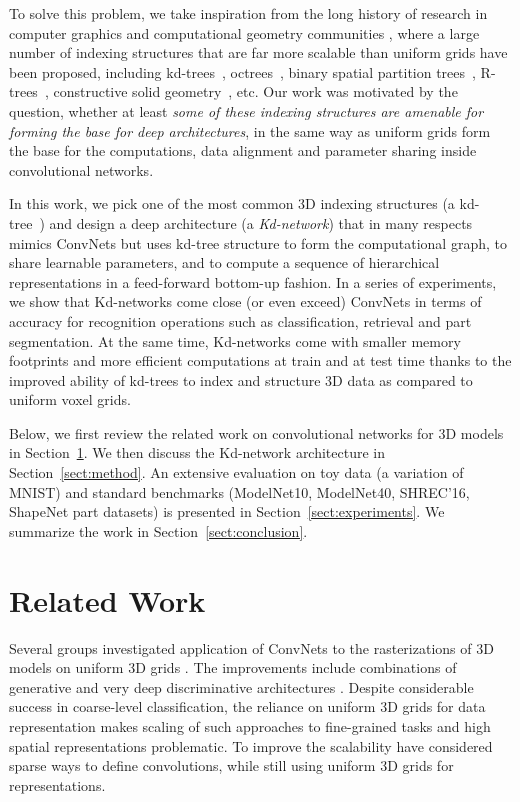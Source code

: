 \documentclass[10pt,twocolumn,letterpaper]{article}
\newcommand{\sect}[1]{Section~\ref{sect:#1}}
\begin{document}
To solve this problem, we take inspiration from the long history of research in computer graphics and computational geometry communities \cite{Samet90,Foley94}, where a large number of indexing structures that are far more scalable than uniform grids have been proposed, including kd-trees~\cite{Bentley75}, octrees~\cite{Meagher80}, binary spatial partition trees~\cite{Schumacker69}, R-trees~\cite{Guttman84}, constructive solid geometry~\cite{Requicha77}, etc. Our work was motivated by the question, whether at least \textit{some of these indexing structures are amenable for forming the base for deep architectures}, in the same way as uniform grids form the base for the computations, data alignment and parameter sharing inside convolutional networks.

In this work, we pick one of the most common 3D indexing structures (a kd-tree~\cite{Bentley75}) and design a deep architecture (a \textit{Kd-network}) that in many respects mimics ConvNets but uses kd-tree structure to form the computational graph, to share learnable parameters, and to compute a sequence of hierarchical representations in a feed-forward bottom-up fashion. In a series of experiments, we show that Kd-networks come close (or even exceed) ConvNets in terms of accuracy for recognition operations such as classification, retrieval and part segmentation. At the same time, Kd-networks come with smaller memory footprints and more efficient computations at train and at test time thanks to the improved ability of kd-trees to index and structure 3D data as compared to uniform voxel grids.

Below, we first review the related work on convolutional networks for 3D models in \sect{related}. We then discuss the Kd-network architecture in \sect{method}. An extensive evaluation on toy data (a variation of MNIST) and standard benchmarks (ModelNet10, ModelNet40, SHREC'16, ShapeNet part datasets) is presented in \sect{experiments}. We summarize the work in \sect{conclusion}.
 \section{Related Work}
\label{sect:related}

Several groups investigated application of ConvNets to the rasterizations of 3D models on uniform 3D grids \cite{Wu15, Maturana15}. The improvements include combinations of generative and very deep discriminative architectures \cite{Brock16, Wu16}. Despite considerable success in coarse-level classification, the reliance on uniform 3D grids for data representation makes scaling of such approaches to fine-grained tasks and high spatial representations problematic. To improve the scalability \cite{Wang15,Li16} have considered sparse ways to define convolutions, while still using uniform 3D grids for representations.
\end{document}
